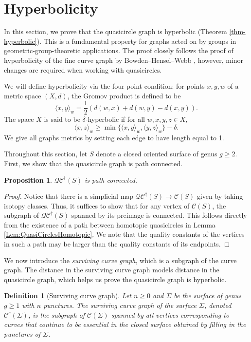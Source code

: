 \documentclass[12pt,a4paper]{amsart}
\newcommand{\calC}{\mathcal{C}}
\theoremstyle{definition}
\theoremstyle{plain}
\newtheorem{proposition}[theorem]{Proposition}
\newtheorem{definition}[theorem]{Definition}
\numberwithin{equation}{section}
\newcommand{\qcg}{\mathcal{QC}^{\dagger}}
\begin{document}
\section{Hyperbolicity}

In this section, we prove that the quasicircle graph is hyperbolic (Theorem \ref{thm-hyperbolic}).
This is a fundamental property for graphs acted on by groups in geometric-group-theoretic applications.
The proof closely follows the proof of hyperbolicity of the fine curve graph by Bowden--Hensel--Webb \cite{bowden2022quasimorphisms}, however, minor changes are required when working with quasicircles.

We will define hyperbolicity via the four point condition: for points $x,y,w$ of a metric space $(X,d)$, the Gromov product is defined to be
\[
\langle x,y \rangle_w = \frac{1}{2} (d(w,x) + d(w,y) - d(x,y)).
\]
The space $X$ is said to be $\delta$-hyperbolic if for all $w,x,y,z \in X$,
\[
\langle x,z \rangle_w \geq \min\{ \langle x,y \rangle_w, \langle y,z \rangle_w \} - \delta.
\]
We give all graphs metrics by setting each edge to have length equal to 1.

Throughout this section, let $S$ denote a closed oriented surface of genus $g \geq 2$.
First, we show that the quasicircle graph is path connected.

\begin{proposition}\label{thm:pathconnected}
    $\qcg(S)$ is path connected.
\end{proposition}

\begin{proof}
    Notice that there is a simplicial map $\qcg(S) \to \calC(S)$ given by taking isotopy classes. Thus, it suffices to show that for any vertex of $\calC(S)$, the subgraph of $\qcg(S)$ spanned by its preimage is connected.
    This follows directly from the existence of a path between homotopic quasicircles in Lemma \ref{Lem:QuasiCirclesHomotopic}. We note that the quality constants of the vertices in such a path  may be larger than the quality constants of its endpoints.
\end{proof}

We now introduce the \textit{surviving curve graph}, which is a subgraph of the curve graph.
The distance in the surviving curve graph models distance in the quasicircle graph, which helps us prove the quasicircle graph is hyperbolic.


\begin{definition}[Surviving curve graph]
Let $n \geq 0$ and $\Sigma$ be the surface of genus $g \geq 1$ with $n$ punctures. The {\rm{surviving curve graph}} of the surface $\Sigma$, denoted $\mathcal{C}^s(\Sigma)$, is the
subgraph of $\calC(\Sigma)$ spanned by all vertices corresponding to curves that continue to be essential
in the closed surface obtained by filling in the punctures of $\Sigma$.
\end{definition}
\end{document}
